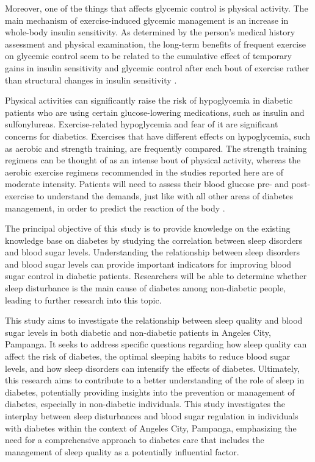 Moreover, one of the things that affects glycemic control is physical activity.
The main mechanism of exercise-induced glycemic management is an increase in
whole-body insulin sensitivity. As determined by the person's medical history
assessment and physical examination, the long-term benefits of frequent exercise
on glycemic control seem to be related to the cumulative effect of temporary
gains in insulin sensitivity and glycemic control after each bout of exercise
rather than structural changes in insulin sensitivity \parencite{shiferaw-2022}.

Physical activities can significantly raise the risk of hypoglycemia in diabetic
patients who are using certain glucose-lowering medications, such as insulin and
sulfonylureas. Exercise-related hypoglycemia and fear of it are significant
concerns for diabetics. Exercises that have different effects on hypoglycemia,
such as aerobic and strength training, are frequently compared. The strength
training regimens can be thought of as an intense bout of physical activity,
whereas the aerobic exercise regimens recommended in the studies reported here
are of moderate intensity. Patients will need to assess their blood glucose pre-
and post-exercise to understand the demands, just like with all other areas of
diabetes management, in order to predict the reaction of the body \parencite{zahalka-2023}.

The principal objective of this study is to provide knowledge on the existing
knowledge base on diabetes by studying the correlation between sleep disorders
and blood sugar levels. Understanding the relationship between sleep disorders
and blood sugar levels can provide important indicators for improving blood
sugar control in diabetic patients. Researchers will be able to determine
whether sleep disturbance is the main cause of diabetes among non-diabetic
people, leading to further research into this topic.

This study aims to investigate the relationship between sleep quality and blood
sugar levels in both diabetic and non-diabetic patients in Angeles City,
Pampanga. It seeks to address specific questions regarding how sleep quality can
affect the risk of diabetes, the optimal sleeping habits to reduce blood sugar
levels, and how sleep disorders can intensify the effects of diabetes.
Ultimately, this research aims to contribute to a better understanding of the
role of sleep in diabetes, potentially providing insights into the prevention or
management of diabetes, especially in non-diabetic individuals. This study
investigates the interplay between sleep disturbances and blood sugar regulation
in individuals with diabetes within the context of Angeles City, Pampanga,
emphasizing the need for a comprehensive approach to diabetes care that includes
the management of sleep quality as a potentially influential factor.

